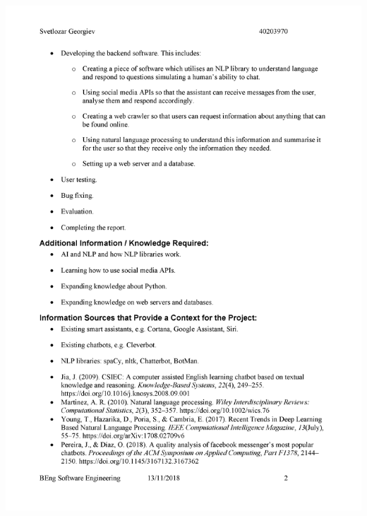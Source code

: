 \documentclass[12pt,a4paper]{article}
\begin{document}
\begin{appendices}
\includegraphics[width=\textwidth,height=\textheight,keepaspectratio]{IPO-1.png}
\newpage

\end{appendices}
\end{document}
